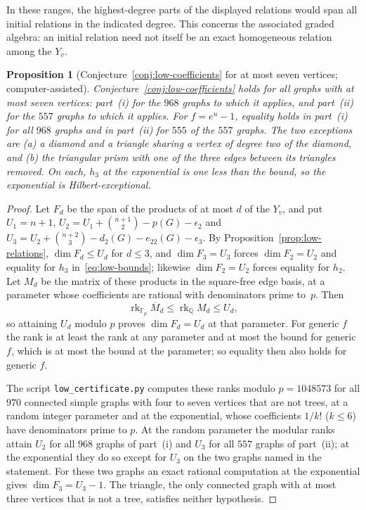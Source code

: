 \documentclass[reqno]{article}
\theoremstyle{plain} %
\newtheorem{proposition}[theorem]{Proposition}
\theoremstyle{definition}
\theoremstyle{remark}
\DeclareMathOperator{\rank}{rk}
\numberwithin{equation}{section}
\begin{document}
In these ranges, the highest-degree parts of the displayed relations
would span all initial relations in the indicated degree. This concerns
the associated graded algebra: an initial relation need not itself be
an exact homogeneous relation among the $Y_v$.

\begin{proposition}[Conjecture~\ref{conj:low-coefficients} for at most seven vertices; computer-assisted]
\label{prop:low-coefficients-small}
Conjecture~\ref{conj:low-coefficients} holds for all graphs with at most
seven vertices: part~(i) for the $968$ graphs to which it applies, and
part~(ii) for the $557$ graphs to which it applies. For $f=e^u-1$,
equality holds in part~(i) for all $968$ graphs and in part~(ii) for
$555$ of the $557$ graphs. The two exceptions are (a) a diamond and a triangle sharing a vertex
of degree two of the diamond, and (b) the triangular prism with one of
the three edges between its triangles removed. On each, $h_3$ at the
exponential is one less than the bound, so the exponential is
Hilbert-exceptional.
\end{proposition}
\begin{proof}
Let $F_d$ be the span of the products of at most $d$ of the $Y_v$, and put
$U_1=n+1$, $U_2=U_1+\binom{n+1}2-p(G)-\epsilon_2$ and
$U_3=U_2+\binom{n+2}3-d_2(G)-e_{22}(G)-\epsilon_3$. By
Proposition~\ref{prop:low-relations}, $\dim F_d\le U_d$ for $d\le3$, and
$\dim F_3=U_3$ forces $\dim F_2=U_2$ and equality for $h_3$
in~\eqref{eq:low-bounds}; likewise $\dim F_2=U_2$ forces equality for
$h_2$. Let $M_d$ be the matrix of these products in the square-free edge
basis, at a parameter whose coefficients are rational with denominators
prime to~$p$. Then
\begin{equation}\label{eq:modular-rank-certificate}
 \rank_{\mathbb F_p}\overline{M}_d
 \le\rank_{\mathbb Q}M_d
 \le U_d,
\end{equation}
so attaining $U_d$ modulo $p$ proves $\dim F_d=U_d$ at that parameter.
For generic $f$ the rank is at least the rank at any parameter and at most
the bound for generic $f$, which is at most the bound at the parameter;
so equality then also holds for generic $f$.

The script \texttt{low\_certificate.py} \cite{Cert} computes these ranks
modulo $p=1048573$ for all $970$ connected simple graphs with four to seven
vertices that are not trees, at a random integer parameter and at the
exponential, whose coefficients $1/k!$ ($k\le6$) have denominators prime
to $p$. At the random parameter the modular ranks attain $U_2$ for all
$968$ graphs of part~(i) and $U_3$ for all $557$ graphs of part~(ii); at
the exponential they do so except for $U_3$ on the two graphs named in the
statement. For these two graphs an exact rational computation at the
exponential gives $\dim F_3=U_3-1$. The triangle, the only connected graph
with at most three vertices that is not a tree, satisfies neither
hypothesis.
\end{proof}
\end{document}
